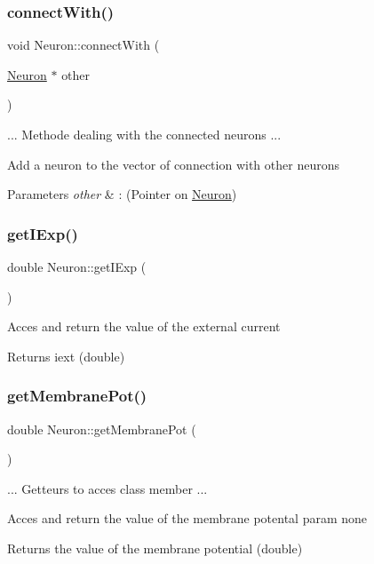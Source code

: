 \subsubsection{\texorpdfstring{connect\+With()}{connectWith()}}
{\footnotesize\ttfamily void Neuron\+::connect\+With (\begin{DoxyParamCaption}\item[{\hyperlink{class_neuron}{Neuron} $\ast$}]{other }\end{DoxyParamCaption})}

... Methode dealing with the connected neurons ...

Add a neuron to the vector of connection with other neurons 
\begin{DoxyParams}{Parameters}
{\em other} & \+: (Pointer on \hyperlink{class_neuron}{Neuron}) \\
\hline
\end{DoxyParams}
\mbox{\label{class_neuron_ad2768482bcfc532fac89f53b512b6ac8}} 
\subsubsection{\texorpdfstring{get\+I\+Exp()}{getIExp()}}
{\footnotesize\ttfamily double Neuron\+::get\+I\+Exp (\begin{DoxyParamCaption}{ }\end{DoxyParamCaption})}

Acces and return the value of the external current \begin{DoxyReturn}{Returns}
iext (double) 
\end{DoxyReturn}
\mbox{\label{class_neuron_a16fc44c9bb8a982d7d79b6df830c02c2}} 
\subsubsection{\texorpdfstring{get\+Membrane\+Pot()}{getMembranePot()}}
{\footnotesize\ttfamily double Neuron\+::get\+Membrane\+Pot (\begin{DoxyParamCaption}{ }\end{DoxyParamCaption})}

... Getteurs to acces class member ...

Acces and return the value of the membrane potental param none \begin{DoxyReturn}{Returns}
the value of the membrane potential (double) 
\end{DoxyReturn}
\mbox{\label{class_neuron_aa7c31be66993ad85efbb5b3a5dc4b9be}} 

